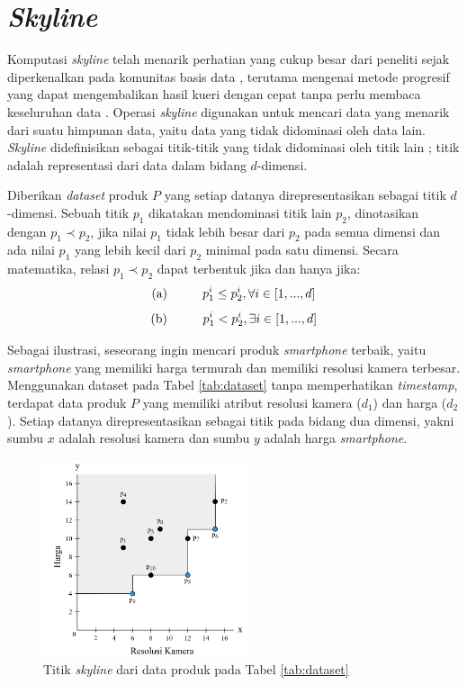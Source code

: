 \section{\textit{Skyline}}
\tab Komputasi \textit{skyline} telah menarik perhatian yang cukup besar dari peneliti sejak diperkenalkan pada komunitas basis data \cite{skyline}, terutama mengenai metode progresif yang dapat mengembalikan hasil kueri dengan cepat tanpa perlu membaca keseluruhan data \cite{dynamic-skyline}. Operasi \textit{skyline} digunakan untuk mencari data yang menarik dari suatu himpunan data, yaitu data yang tidak didominasi oleh data lain. \textit{Skyline} didefinisikan sebagai titik-titik yang tidak didominasi oleh titik lain \cite{skyline}; titik adalah representasi dari data dalam bidang $d$-dimensi.

Diberikan \textit{dataset} produk $P$ yang setiap datanya direpresentasikan sebagai titik $d$-dimensi. Sebuah titik $p_1$ dikatakan mendominasi titik lain $p_2$, dinotasikan dengan  $p_1 \prec p_2$, jika nilai $p_1$ tidak lebih besar dari $p_2$ pada semua dimensi dan ada nilai $p_1$ yang lebih kecil dari $p_2$ minimal pada satu dimensi. Secara matematika, relasi $p_1 \prec p_2$ dapat terbentuk jika dan hanya jika:
\[\text{(a)} \hspace*{1cm} p_1^i \leq p_2^i, \forall i \in [1, ..., d]\] 
\[\text{(b)} \hspace*{1cm} p_1^i < p_2^i, \exists i \in [1, ..., d]\]

Sebagai ilustrasi, seseorang ingin mencari produk \textit{smartphone} terbaik, yaitu \textit{smartphone} yang memiliki harga termurah dan memiliki resolusi kamera terbesar. Menggunakan dataset pada Tabel \ref{tab:dataset} tanpa memperhatikan \textit{timestamp}, terdapat data produk $P$ yang memiliki atribut resolusi kamera ($d_1$) dan harga ($d_2$). Setiap datanya direpresentasikan sebagai titik pada bidang dua dimensi, yakni sumbu $x$ adalah resolusi kamera dan sumbu $y$ adalah harga \textit{smartphone}.

\begin{figure}[h]
	\centering
	\includegraphics[width=6cm]{assets/img/bab2/skyline.png}
	\caption{Titik \textit{skyline} dari data produk pada Tabel \ref{tab:dataset}}
	\label{fig:skyline}
\end{figure}

